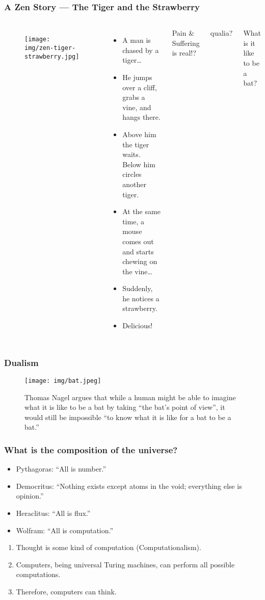\documentclass[UTF8,11pt,colorlinks,compress,openany]{beamer}%
\begin{document}
\begin{frame}\frametitle{A Zen Story --- The Tiger and the Strawberry}
\begin{columns}
\begin{figure}[H]
\texttt{[image: img/zen-tiger-strawberry.jpg]}	
\end{figure}
\begin{itemize}
	\item A man is chased by a tiger\dots
	\item He jumps over a cliff, grabs a vine, and hangs there.
	\item Above him the tiger waits. Below him circles another tiger.
	\item At the same time, a mouse comes out and starts chewing on the vine\dots
	\item Suddenly, he notices a strawberry.
	\item Delicious!
\end{itemize}
\centerline{Pain \& Suffering is real!?}
\centerline{qualia?}
\centerline{What is it like to be a bat?}
\end{columns}
\end{frame}

\begin{frame}\frametitle{Dualism}
\begin{figure}[H]
\texttt{[image: img/bat.jpeg]}
\caption{Thomas Nagel argues that while a human might be able to imagine what it is like to be a bat by taking ``the bat's point of view'', it would still be impossible ``to know what it is like for a bat to be a bat.''}
\end{figure}
\end{frame}

\begin{frame}\frametitle{What is the composition of the universe?}
\begin{itemize}
	\item Pythagoras: ``All is number.''
	\item Democritus: ``Nothing exists except atoms in the void; everything else is opinion.''
	\item Heraclitus: ``All is flux.''
	\item Wolfram: ``All is computation.''
\end{itemize}
\begin{enumerate}
	\item Thought is some kind of computation (Computationalism).
	\item Computers, being universal Turing machines, can perform all possible computations.
	\item Therefore, computers can think.
\end{enumerate}
\end{frame}
\end{document}
